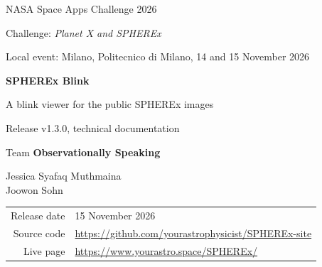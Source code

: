 \documentclass[11pt,a4paper]{article}
\newcommand{\Version}{v1.3.0}
\newcommand{\ReleaseDate}{15 November 2026}
\newcommand{\TeamName}{Observationally Speaking}
\newcommand{\Members}{Jessica Syafaq Muthmaina \\ Joowon Sohn}
\newcommand{\Repo}{\url{https://github.com/yourastrophysicist/SPHEREx-site}}
\newcommand{\ProjectPage}{\url{https://www.yourastro.space/SPHEREx/}}
\begin{document}
\begin{titlepage}
  \centering
  \vspace*{2cm}
  {\large NASA Space Apps Challenge 2026 \par}
  {\large Challenge: \emph{Planet X and SPHEREx} \par}
  {\large Local event: Milano, Politecnico di Milano, 14 and 15 November 2026 \par}
  \vspace{2.2cm}
  {\Huge\bfseries\color{siteblue} SPHEREx Blink \par}
  \vspace{0.5cm}
  {\Large A blink viewer for the public SPHEREx images \par}
  \vspace{0.4cm}
  {\large Release \Version, technical documentation \par}
  \vspace{2.2cm}
  {\large Team \textbf{\TeamName} \par}
  \vspace{0.4cm}
  {\Members \par}
  \vfill
  \begin{tabular}{rl}
    Release date & \ReleaseDate \\
    Source code  & \Repo \\
    Live page    & \ProjectPage \\
  \end{tabular}
  \vspace{1cm}
\end{titlepage}

\begin{abstract}
\noindent
SPHEREx Blink is a public web page that shows the same small patch of sky in every
SPHEREx visit, one after the other, like a flipbook. On a fixed north-up grid the field stars
stand still, so anything close enough to move, or anything that changes brightness, stands out
to the eye. The page has two steps. A whole-sky map shows where the patch sits, and a blink
viewer plays the SPHEREx images of it, in any of the six detectors, as one median image per
six-month sky pass or as every single exposure. Gaia DR3 and CatWISE2020 sources are drawn on
top, each moved to the date of the image with its own proper motion. The five test targets of
the challenge ship as static files in all six detectors, 60 views in all, so the page works on
plain static hosting. Any other position, typed in, picked with the lens or picked from a
list of 29 well-known objects on the map, goes through a small relay function on yourastro.space
that asks the NASA/IPAC Infrared Science Archive (IRSA) live and runs the same steps in about
half a minute. Every setting lives in the page URL, so one
link is one view. This document describes release \Version: the data path, the files the
page reads, the page itself, how to run it, how it was tested, and what it cannot do.
\end{abstract}
\end{document}

